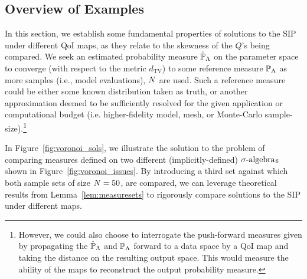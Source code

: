 \subsection{Overview of Examples}
In this section, we establish some fundamental properties of solutions to the SIP under different QoI maps, as they relate to the skewness of the $Q$'s being compared.
We seek an estimated probability measure $\hat{\mathbb{P}}_{\Lambda}$ on the parameter space to converge (with respect to the metric $d_\text{TV}$) to some reference measure $\mathbb{P}_{\Lambda}$ as more samples (i.e., model evaluations), $N$ are used.
Such a reference measure could be either some known distribution taken as truth, or another approximation deemed to be sufficiently resolved for the given application or computational budget (i.e. higher-fidelity model, mesh, or Monte-Carlo sample-size).\footnote{However, we could also choose to interrogate the push-forward measures given by propagating the $\hat{\mathbb{P}}_{\Lambda}$ and $\mathbb{P}_{\Lambda}$ forward to a data space by a QoI map and taking the distance on the resulting output space.
This would measure the ability of the maps to reconstruct the output probability measure.}

In Figure~\ref{fig:voronoi_sols}, we illustrate the solution to the problem of comparing measures defined on two different (implicitly-defined) $\sigma\text{-algebra}$s shown in Figure~\ref{fig:voronoi_issues}.
By introducing a third set against which both sample sets of size $N=50$, are compared, we can leverage theoretical results from Lemma~\ref{lem:measuresets} to rigorously compare solutions to the SIP under different maps.

